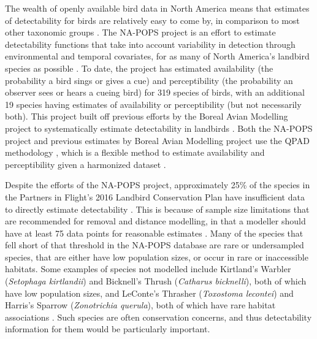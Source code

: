 \documentclass[12pt]{article}
\begin{document}
\par The wealth of openly available bird data in North America means that estimates of detectability for birds are relatively easy to come by, in comparison to most other taxonomic groups \citep{bennett_how_2023}. 
The NA-POPS project is an effort to estimate detectability functions that take into account variability in detection through environmental and temporal covariates, for as many of North America’s landbird species as possible \citep{edwards_point_2023}.
To date, the project has estimated availability (the probability a bird sings or gives a cue) and perceptibility (the probability an observer sees or hears a cueing bird) for 319 species of birds, with an additional 19 species having estimates of availability or perceptibility (but not necessarily both). This project built off previous efforts by the Boreal Avian Modelling project \citep{cumming_toward_2010} to systematically estimate detectability in landbirds \citep{solymos_calibrating_2013, solymos_evaluating_2018}.
Both the NA-POPS project and previous estimates by Boreal Avian Modelling project use the QPAD methodology \citep{solymos_calibrating_2013}, which is a flexible method to estimate availability and perceptibility given a harmonized dataset \citep{barker_ecological_2015}.

\par Despite the efforts of the NA-POPS project, approximately 25\% of the species in the Partners in Flight’s 2016 Landbird Conservation Plan \citep{rosenberg_partners_2016} have insufficient data to directly estimate detectability \citep{edwards_point_2023}.
This is because of sample size limitations that are recommended for removal and distance modelling, in that a modeller should have at least 75 data points for reasonable estimates \citep{buckland_introduction_2001, solymos_calibrating_2013}. 
Many of the species that fell short of that threshold in the NA-POPS database are rare or undersampled species, that are either have low population sizes, or occur in rare or inaccessible habitats.
Some examples of species not modelled include Kirtland’s Warbler (\textit{Setophaga kirtlandii}) and Bicknell’s Thrush (\textit{Catharus bicknelli}), both of which have low population sizes, and LeConte’s Thrasher (\textit{Toxostoma lecontei}) and Harris’s Sparrow (\textit{Zonotrichia querula}), both of which have rare habitat associations \citep{will_handbook_2020}. 
Such species are often conservation concerns, and thus detectability information for them would be particularly important.
\end{document}

